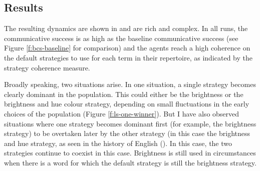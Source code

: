 \subsection{Results}

The resulting dynamics are shown in  and are
rich and complex. In all runs, the communicative success is as high as
the baseline communicative success (see Figure
\ref{f:bcs-baseline} for comparison) and the agents reach a
high coherence on the default strategies to use for each term in their
repertoire, as indicated by the strategy coherence measure.

Broadly speaking, two situations arise. In one situation, a single
strategy becomes clearly dominant in the population. This could either
be the brightness or the brightness and hue colour strategy, depending
on small fluctuations in the early choices of the population (Figure
\ref{f:ls-one-winner}). But I have also observed situations where one
strategy becomes dominant first (for example, the brightness
  strategy) to be overtaken later by the other strategy (in this case
the brightness and hue strategy, as seen in the history of
English (). In this case, the two
strategies continue to coexist in this case. Brightness is still used
in circumstances when there is a word for which the default strategy
is still the brightness strategy.

